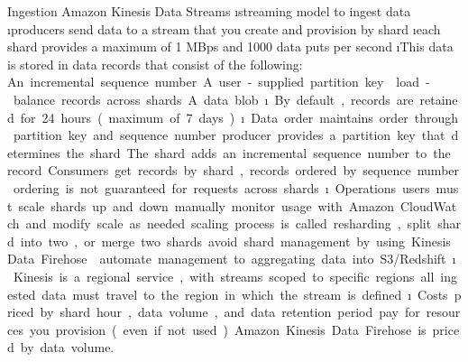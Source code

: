 \begin{frame}[allowframebreaks]{Ingestion}
\framebreak
Amazon Kinesis Data Streams
\i streaming model to ingest data
\i producers send data to a stream that you create and provision by shard
\i each shard provides a maximum of 1 MBps and 1000 data puts per second
\i This data is stored in data records that consist of the following:
\si An incremental sequence number
\si A user-supplied partition key
\ssi load-balance records across shards
\si A data blob
\i By default, records are retained for 24 hours (maximum of 7 days)
\i Data order
\si maintains order through partition key and sequence number
\si producer provides a partition key that determines the shard
\si The shard adds an incremental sequence number to the record
\si Consumers get records by shard, records ordered by sequence number
\si ordering is not guaranteed for requests across shards
\i Operations
\si users must scale shards up and down manually
\si monitor usage with Amazon CloudWatch and modify scale as needed
\si scaling process is called resharding, 
\si split shard into two, or merge two shards
\si avoid shard management by using Kinesis Data Firehose
\ssi automate management to aggregating data into S3/Redshift
\i Kinesis is a regional service, with streams scoped to specific regions
\si all ingested data must travel to the region in which the stream is defined.
\i Costs
\si priced by shard hour, data volume, and data retention period
\si pay for resources you provision (even if not used)
\si Amazon Kinesis Data Firehose is priced by data volume.




\end{frame}

